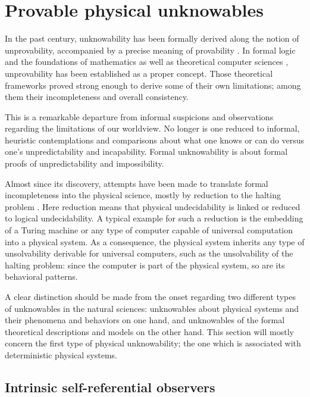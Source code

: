 \documentclass[rmp,amsfonts,showpacs,showkeys]{revtex4}
\begin{document}
\section{Provable physical unknowables}

In the past century, unknowability has been formally derived along the notion of unprovability,
accompanied by a precise meaning of provability \cite{rogers1,odi:89,odi:99}.
In formal logic \cite{godel1} and the foundations of mathematics \cite{tarski:32,tarski:56}
as well as theoretical computer sciences \cite{turing-36,chaitin3},
unprovability has been established as a proper concept.
Those theoretical frameworks proved strong enough to derive some of their own limitations;
among them their incompleteness and overall consistency.

This is a remarkable departure from informal suspicions and observations regarding the limitations
of our worldview.
No longer is one reduced to informal, heuristic contemplations and comparisons about what one knows or can do versus
one's unpredictability and incapability.
Formal unknowability is about formal proofs of unpredictability and impossibility.

Almost since its discovery, attempts \cite{popper-50i,popper-50ii} have been made to translate
formal incompleteness into the physical science,
mostly by reduction to the halting problem \cite{moore,casti:94-onlimits_book,casti:96-onlimits}.
Here reduction means that physical undecidability is linked or reduced to logical undecidability.
A typical example for such a reduction is the embedding of a Turing machine or any type of computer capable of
universal computation into a physical system.
As a consequence, the physical system inherits
any type of unsolvability derivable for universal computers, such as the
unsolvability of the halting problem:
since the computer is part of the physical system, so are its behavioral patterns.


A clear distinction should be made from the onset regarding two different types of unknowables in
the natural sciences: unknowables about physical systems and their phenomena and behaviors on one hand,
and unknowables of the formal theoretical descriptions and models on the other hand.
This section will mostly concern the first type of physical unknowability;
the one which is associated with deterministic physical systems.





\subsection{Intrinsic self-referential observers}
\end{document}
